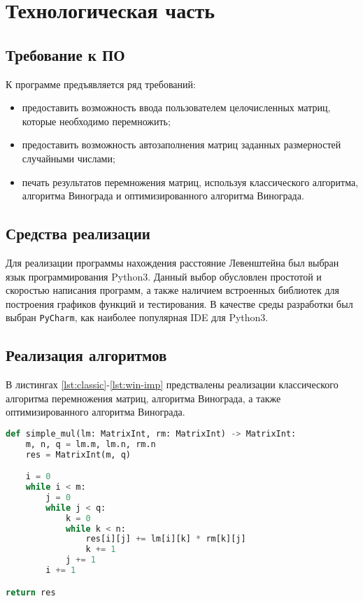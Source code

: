 \chapter{Технологическая часть}

\section{Требование к ПО}
К программе предъявляется ряд требований:
\begin{itemize}
    \item предоставить возможность ввода пользователем целочисленных матриц, которые необходимо перемножить;
	\item предоставить возможность автозаполнения матриц заданных размерностей случайными числами;
	\item печать результатов перемножения матриц, используя классического алгоритма, алгоритма
    Винограда и оптимизированного алгоритма Винограда.
\end{itemize}

\section{Средства реализации}
Для реализации программы нахождения расстояние Левенштейна был выбран язык программирования Python3\cite{python}.
Данный выбор обусловлен простотой и скоростью написания программ, а также наличием встроенных библиотек для построения
графиков функций и тестирования. В качестве среды разработки был выбран \texttt{PyCharm}\cite{pycharm}, как наиболее 
популярная IDE для Python3. 

\section{Реализация алгоритмов}

В листингах \ref{lst:classic}-\ref{lst:win-imp} предствалены реализации классического алгоритма перемножения матриц, алгоритма Винограда, а также оптимизированного 
алгоритма Винограда.

\begin{lstlisting}[style=mypython, label=lst:classic,caption=Функция классического перемножения матриц,language=python]
def simple_mul(lm: MatrixInt, rm: MatrixInt) -> MatrixInt:
    m, n, q = lm.m, lm.n, rm.n
    res = MatrixInt(m, q)

    i = 0
    while i < m:
        j = 0
        while j < q:
            k = 0
            while k < n:
                res[i][j] += lm[i][k] * rm[k][j]
                k += 1
            j += 1
        i += 1

return res
\end{lstlisting}

